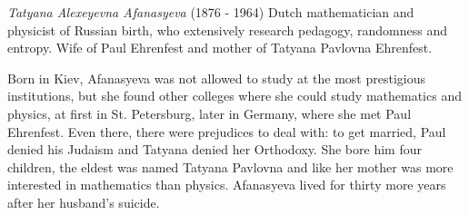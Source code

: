 \documentclass[12pt]{article}
\begin{document}
\emph{Tatyana Alexeyevna Afanasyeva} (1876 - 1964) Dutch mathematician and physicist of Russian birth, who extensively research pedagogy, randomness and entropy. Wife of Paul Ehrenfest and mother of Tatyana Pavlovna Ehrenfest.

Born in Kiev, Afanasyeva was not allowed to study at the most prestigious institutions, but she found other colleges where she could study mathematics and physics, at first in St. Petersburg, later in Germany, where she met Paul Ehrenfest. Even there, there were prejudices to deal with: to get married, Paul denied his Judaism and Tatyana denied her Orthodoxy. She bore him four children, the eldest was named Tatyana Pavlovna and like her mother was more interested in mathematics than physics. Afanasyeva lived for thirty more years after her husband's suicide.
\end{document}
